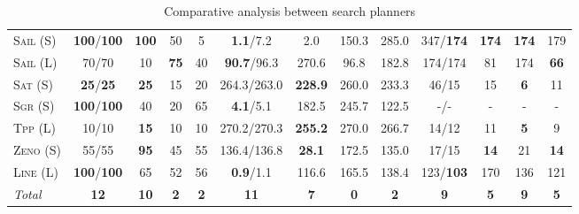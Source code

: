\documentclass[11pt]{article}
\begin{document}
\begin{table*}[tb]
{\begin{tabular}{|l||cccc||cccc||cccc||}
\textsc{Sail} (S)&\textbf{100}/\textbf{100}&\textbf{100}&50&5&\textbf{1.1}/7.2&2.0&150.3&285.0&347/\textbf{174}&\textbf{174}&\textbf{174}&179\\
\textsc{Sail} (L)&70/70&10&\textbf{75}&40&\textbf{90.7}/96.3&270.6&96.8&182.8&174/174&81&174&\textbf{66}\\
\textsc{Sat} (S)&\textbf{25}/\textbf{25}&\textbf{25}&15&20&264.3/263.0&\textbf{228.9}&260.0&233.3&46/15&15&\textbf{6}&11\\
\textsc{Sgr} (S)&\textbf{100}/\textbf{100}&40&20&65&\textbf{4.1}/5.1&182.5&245.7&122.5&-/-&-&-&-\\
\textsc{Tpp} (L)&10/10&\textbf{15}&10&10&270.2/270.3&\textbf{255.2}&270.0&266.7&14/12&11&\textbf{5}&9\\
\textsc{Zeno} (S)&55/55&\textbf{95}&45&55&136.4/136.8&\textbf{28.1}&172.5&135.0&17/15&\textbf{14}&21&\textbf{14}\\
\textsc{Line} (L)&\textbf{100}/\textbf{100}&65&52&56&\textbf{0.9}/1.1&116.6&165.5&138.4&123/\textbf{103}&170&136&121
\\\hline
\textit{Total}&\textbf{12}&\textbf{10}&\textbf{2}&\textbf{2}&\textbf{11}&\textbf{7}&\textbf{0}&\textbf{2}&\textbf{9}&\textbf{5}&\textbf{9}&\textbf{5}\\\hline

        \end{tabular}}
        \caption{Comparative analysis between search planners}
        \label{tab:search}
        \end{table*}
        
\end{document}

